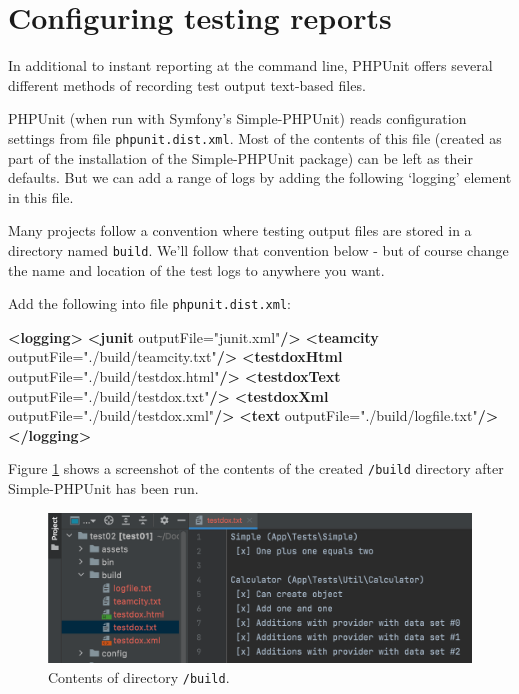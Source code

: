 \documentclass[a4paperpaper,openright]{book}
\newenvironment{Shaded}{}{}
\newcommand{\KeywordTok}[1]{\textcolor[rgb]{0.00,0.44,0.13}{\textbf{#1}}}
\newcommand{\OtherTok}[1]{\textcolor[rgb]{0.00,0.44,0.13}{#1}}
\newcommand{\StringTok}[1]{\textcolor[rgb]{0.25,0.44,0.63}{#1}}
\begin{document}
\hypertarget{configuring-testing-reports}{%
\section{Configuring testing
reports}\label{configuring-testing-reports}}

In additional to instant reporting at the command line, PHPUnit offers
several different methods of recording test output text-based files.

PHPUnit (when run with Symfony's Simple-PHPUnit) reads configuration
settings from file \texttt{phpunit.dist.xml}. Most of the contents of
this file (created as part of the installation of the Simple-PHPUnit
package) can be left as their defaults. But we can add a range of logs
by adding the following `logging' element in this file.

Many projects follow a convention where testing output files are stored
in a directory named \texttt{build}. We'll follow that convention below
- but of course change the name and location of the test logs to
anywhere you want.

Add the following into file \texttt{phpunit.dist.xml}:

\begin{Shaded}
\begin{Highlighting}[]
    \KeywordTok{<logging>}
        \KeywordTok{<junit}\OtherTok{ outputFile=}\StringTok{"junit.xml"}\KeywordTok{/>}
        \KeywordTok{<teamcity}\OtherTok{ outputFile=}\StringTok{"./build/teamcity.txt"}\KeywordTok{/>}
        \KeywordTok{<testdoxHtml}\OtherTok{ outputFile=}\StringTok{"./build/testdox.html"}\KeywordTok{/>}
        \KeywordTok{<testdoxText}\OtherTok{ outputFile=}\StringTok{"./build/testdox.txt"}\KeywordTok{/>}
        \KeywordTok{<testdoxXml}\OtherTok{ outputFile=}\StringTok{"./build/testdox.xml"}\KeywordTok{/>}
        \KeywordTok{<text}\OtherTok{ outputFile=}\StringTok{"./build/logfile.txt"}\KeywordTok{/>}
    \KeywordTok{</logging>}
\end{Highlighting}
\end{Shaded}

Figure \ref{build_contents} shows a screenshot of the contents of the
created \texttt{/build} directory after Simple-PHPUnit has been run.

\begin{figure}
\centering
\includegraphics{./tex2pdf.-5a4428120ede4be1/3559f32c2528365c9a16e82840e354027eaf070d.png}
\caption{Contents of directory \texttt{/build}. \label{build_contents}}
\end{figure}
\end{document}
